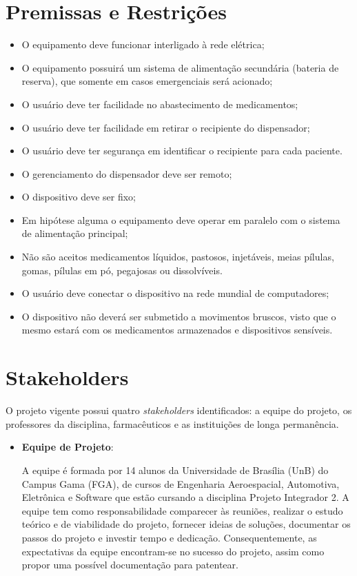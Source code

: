 \begin{apendicesenv}
\section{Premissas e Restrições}

\begin{itemize}
    \item O equipamento deve funcionar interligado à rede elétrica;
    \item O equipamento possuirá um sistema de alimentação secundária (bateria de reserva), que somente em casos emergenciais será acionado;
    \item O usuário deve ter facilidade no abastecimento de medicamentos;
    \item O usuário deve ter facilidade em retirar o recipiente do dispensador;
    \item O usuário deve ter segurança em identificar o recipiente para cada paciente. 
    \item O gerenciamento do dispensador deve ser remoto;
    \item O dispositivo deve ser fixo;
    \item Em hipótese alguma o equipamento deve operar em paralelo com o sistema de alimentação principal;
    \item Não são aceitos medicamentos líquidos, pastosos, injetáveis, meias pílulas, gomas, pílulas em pó, pegajosas ou dissolvíveis.
    \item O usuário deve conectar o dispositivo na rede mundial de computadores;
    \item O dispositivo não deverá ser submetido a movimentos bruscos, visto que o mesmo estará com os medicamentos armazenados e dispositivos sensíveis.
\end{itemize}

\section{Stakeholders}
O projeto vigente possui quatro \textit{stakeholders} identificados: a equipe do projeto, os professores da disciplina, farmacêuticos e as instituições de longa permanência.

\begin{itemize}
\item \textbf{Equipe de Projeto}:

A equipe é formada por 14 alunos da Universidade de Brasília (UnB) do Campus Gama (FGA), de cursos de Engenharia Aeroespacial, Automotiva, Eletrônica e Software que estão cursando a disciplina Projeto Integrador 2. A equipe tem como responsabilidade  comparecer às reuniões, realizar o estudo teórico e de viabilidade do projeto, fornecer ideias de soluções, documentar os passos do projeto e investir tempo e dedicação. Consequentemente, as expectativas da equipe encontram-se no sucesso do projeto, assim como propor uma possível documentação para patentear.


\end{itemize}
\end{apendicesenv}
